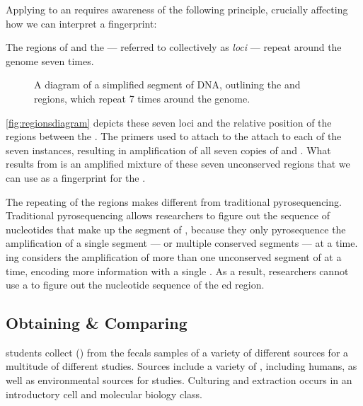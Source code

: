 Applying \pcr{} to an \ecoli{} \isol{} requires awareness of the following principle, crucially affecting how we can interpret a fingerprint:

\begin{principle}
The \itsshort{} regions of \ecoli{} and the \rrna{} --- referred to collectively as \textit{loci} --- repeat around the \ecoli{} genome seven times.
\end{principle}

\begin{figure}
    \centering
    
    \caption{A diagram of a simplified segment of \ecoli{} DNA, outlining the \Ssixt{} and \Sfive{} \itsshort{} regions, which repeat 7 times around the \ecoli{} genome.}
    \label{fig:regionsdiagram}
\end{figure}
\autoref{fig:regionsdiagram} depicts these seven loci and the relative position of the \itsshort{} regions between the \rrna{}.
The primers used to attach to the \rrna{} attach to each of the seven instances, resulting in \pcr{} amplification of all seven copies of \Ssixt{} and \Sfive{}.
What results from \pcr{} is an amplified mixture of these seven unconserved \itsshort{} regions that we can use as a fingerprint for the \isol{}.


The repeating of the \itsshort{} regions makes \pyros{} different from traditional pyrosequencing.
Traditional pyrosequencing allows researchers to figure out the sequence of nucleotides that make up the segment of \dna{}, because they only pyrosequence the \pcr{} amplification of a single segment --- or multiple conserved segments --- at a time.
\Pyro{}ing considers the \pcr{} amplification of more than one unconserved segment of \dna{} at a time, encoding more information with a single \pyro{}.
As a result, \cplop{} researchers cannot use a \pyro{} to figure out the nucleotide sequence of the \pyro{}ed \itsshort{} region.

\subsection{Obtaining \& Comparing \ecolilong{} \Isols{}}
\cp{} students collect \ecolilong{} (\ecoli{}) \isols{} from the fecals samples of a variety of different sources for a multitude of different studies.
Sources include a variety of \spec{}, including humans, as well as environmental sources for \mst{} studies.
Culturing and \ecoli{} extraction occurs in an introductory cell and molecular biology class.


